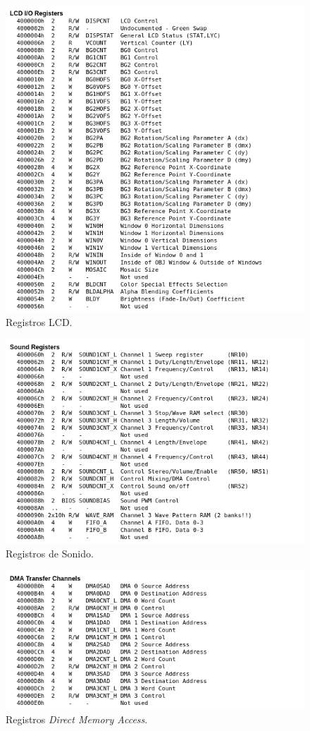 \begin{figure}[h]
	\centering
	\includegraphics[width=.9\textwidth]{capitulos/apendice/reg_1.png}
	\caption{Registros LCD.}\label{fig:ap_reg_1}
\end{figure}

\begin{figure}[h]
	\centering
	\includegraphics[width=.9\textwidth]{capitulos/apendice/reg_2.png}
	\caption{Registros de Sonido.}\label{fig:ap_reg_2}
\end{figure}

\begin{figure}[h]
	\centering
	\includegraphics[width=.9\textwidth]{capitulos/apendice/reg_3.png}
	\caption{Registros \textit{Direct Memory Access}.}\label{fig:ap_reg_3}
\end{figure}

